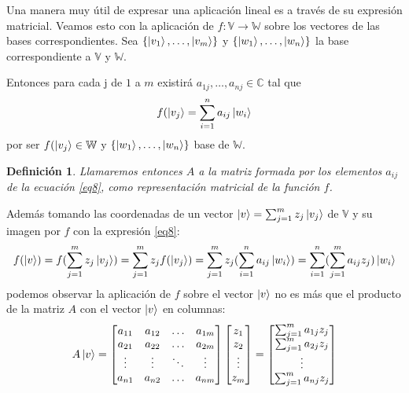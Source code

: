 \documentclass[a4paper]{article}
\newtheorem{deff}{Definición}[section]
\numberwithin{equation}{section}
\begin{document}
Una manera muy útil de expresar una aplicación lineal es a través de su expresión matricial. Veamos esto con la aplicación de $f:\mathbb{V} \longrightarrow \mathbb{W}$ sobre los vectores de las bases correspondientes. Sea $\{ \ket{v_1}, \ldots, \ket{v_m} \}$ y $\{ \ket{w_1}, \ldots, \ket{w_n} \}$ la base correspondiente a $\mathbb{V}$ y $\mathbb{W}$.

Entonces para cada j de $1$ a $m$ existirá $a_{1j}, \ldots, a_{nj} \in \mathbb{C}$ tal que
\begin{equation} \label{eq8}
f(\ket{v_j} = \sum_{i=1}^n a_{ij} \ket{w_i}
\end{equation}
por ser $f(\ket{v_j} \in \mathbb{W}$ y $\{ \ket{w_1}, \ldots, \ket{w_n} \}$ base de $\mathbb{W}$.

\begin{deff}Llamaremos entonces $A$ a la matriz formada por los elementos $a_{ij}$ de la ecuación \ref{eq8}, como representación matricial de la función $f$.
\end{deff}

Además tomando las coordenadas de un vector $\ket{v} = \sum_{j=1}^m z_j \ket{v_j}$ de $\mathbb{V}$ y su imagen por $f$ con la expresión \ref{eq8}:
\begin{equation}
f(\ket{v}) = f(\sum_{j=1}^m z_j \ket{v_j}) = \sum_{j=1}^m z_j f(\ket{v_j}) = \sum_{j=1}^m z_j (\sum_{i=1}^n a_{ij} \ket{w_i}) = 
\sum_{i=1}^n (\sum_{j=1}^m a_{ij} z_{j}) \ket{w_i}
\end{equation}
podemos observar la aplicación de $f$ sobre el vector $\ket{v}$ no es más que el producto de la matriz $A$ con el vector $\ket{v}$ en columnas:
\begin{equation}
A\ket{v} = 
\begin{bmatrix}
a_{11} & a_{12} &\ldots & a_{1m} \\
a_{21} & a_{22} &\ldots & a_{2m} \\
\vdots & \vdots &\ddots & \vdots \\
a_{n1} & a_{n2} &\ldots & a_{nm}
\end{bmatrix}
\begin{bmatrix}
z_1 \\ z_2 \\ \vdots \\ z_m
\end{bmatrix} =
\begin{bmatrix}
\sum_{j=1}^m a_{1j}z_j \\
\sum_{j=1}^m a_{2j}z_j \\
\vdots \\
\sum_{j=1}^m a_{nj}z_j \\
\end{bmatrix}
\end{equation}
\end{document}
